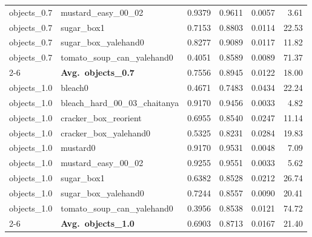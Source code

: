 \begin{longtable}{llrrrr}
  objects_0.7 & mustard\_easy\_00\_02 & 0.9379 & 0.9611 & 0.0057 & 3.61 \\
  objects_0.7 & sugar\_box1 & 0.7153 & 0.8803 & 0.0114 & 22.53 \\
  objects_0.7 & sugar\_box\_yalehand0 & 0.8277 & 0.9089 & 0.0117 & 11.82 \\
  objects_0.7 & tomato\_soup\_can\_yalehand0 & 0.4051 & 0.8589 & 0.0089 & 71.37 \\
  \cmidrule{2-6}
  & \textbf{Avg.~objects_0.7} & 0.7556 & 0.8945 & 0.0122 & 18.00 \\
  \midrule
  objects_1.0 & bleach0 & 0.4671 & 0.7483 & 0.0434 & 22.24 \\
  objects_1.0 & bleach\_hard\_00\_03\_chaitanya & 0.9170 & 0.9456 & 0.0033 & 4.82 \\
  objects_1.0 & cracker\_box\_reorient & 0.6955 & 0.8540 & 0.0247 & 11.14 \\
  objects_1.0 & cracker\_box\_yalehand0 & 0.5325 & 0.8231 & 0.0284 & 19.83 \\
  objects_1.0 & mustard0 & 0.9170 & 0.9531 & 0.0048 & 7.09 \\
  objects_1.0 & mustard\_easy\_00\_02 & 0.9255 & 0.9551 & 0.0033 & 5.62 \\
  objects_1.0 & sugar\_box1 & 0.6382 & 0.8528 & 0.0212 & 26.74 \\
  objects_1.0 & sugar\_box\_yalehand0 & 0.7244 & 0.8557 & 0.0090 & 20.41 \\
  objects_1.0 & tomato\_soup\_can\_yalehand0 & 0.3956 & 0.8538 & 0.0121 & 74.72 \\
  \cmidrule{2-6}
  & \textbf{Avg.~objects_1.0} & 0.6903 & 0.8713 & 0.0167 & 21.40 \\
  \midrule
\bottomrule
\end{longtable}